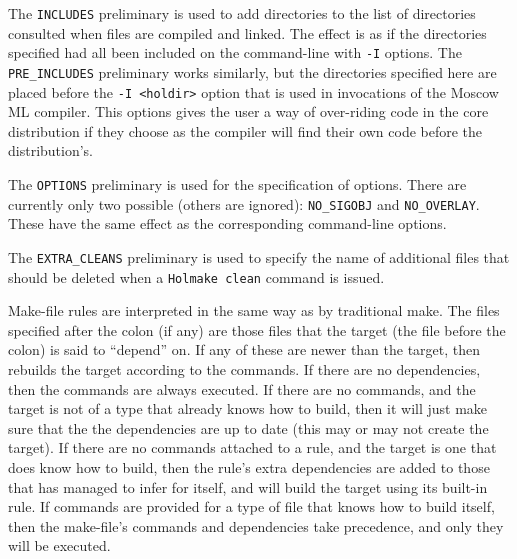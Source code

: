The \texttt{INCLUDES} preliminary is used to add directories to the
list of directories consulted when files are compiled and linked.  The
effect is as if the directories specified had all been included on the
command-line with \texttt{-I} options.  The \texttt{PRE\_INCLUDES}
preliminary works similarly, but the directories specified here are
placed before the \mbox{\texttt{-I <holdir>}} option that is used in
invocations of the Moscow ML compiler.  This options gives the user a
way of over-riding code in the core distribution if they choose as the
compiler will find their own code before the distribution's.

The \texttt{OPTIONS} preliminary is used for the specification of
options.  There are currently only two possible (others are ignored):
\texttt{NO\_SIGOBJ} and \texttt{NO\_OVERLAY}.  These have the same
effect as the corresponding command-line options.

The \texttt{EXTRA\_CLEANS} preliminary is used to specify the name of
additional files that should be deleted when a \texttt{Holmake clean}
command is issued.

Make-file rules are interpreted in the same way as by traditional
\textsf{make}.  The files specified after the colon (if any) are those
files that the target (the file before the colon) is said to
``depend'' on.  If any of these are newer than the target, then
\holmake{} rebuilds the target according to the commands.  If there
are no dependencies, then the commands are always executed.  If there
are no commands, and the target is not of a type that \holmake{}
already knows how to build, then it will just make sure that the the
dependencies are up to date (this may or may not create the target).
If there are no commands attached to a rule, and the target is one
that \holmake{} does know how to build, then the rule's extra
dependencies are added to those that \holmake{} has managed to infer
for itself, and \holmake{} will build the target using its built-in
rule.  If commands are provided for a type of file that \holmake{}
knows how to build itself, then the make-file's commands and
dependencies take precedence, and only they will be executed.

